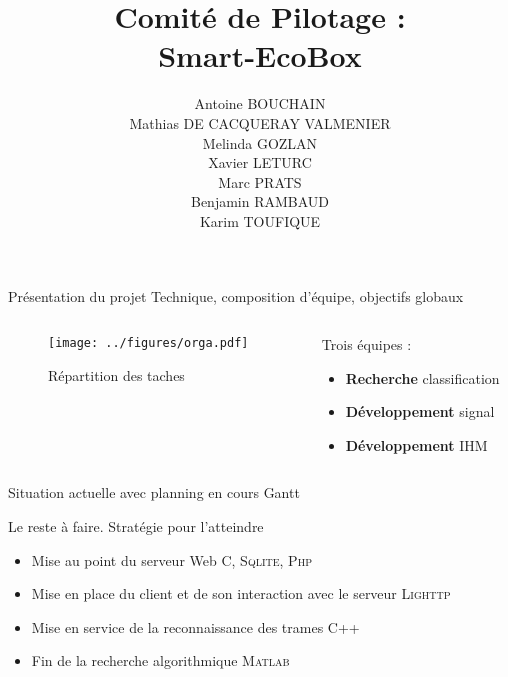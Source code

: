\documentclass{beamer}
\title[Comité de Pilotage : Smart-EcoBox]{Comité de Pilotage :\\
Smart-EcoBox}
\author{Antoine BOUCHAIN \\
Mathias DE CACQUERAY VALMENIER \\
Melinda GOZLAN \\
Xavier LETURC \\
Marc PRATS \\
Benjamin RAMBAUD \\
Karim TOUFIQUE \\}
\institute{\textsc{ENSEIRB-MATMECA}}
\begin{document}
\begin{frame}
\titlepage
\end{frame}


\begin{frame}{Présentation du projet Technique, composition d’équipe, objectifs globaux}
   \begin{columns}[c]
  \begin{column}{8cm}
 \begin{figure}[h!]
 \centering
 	\texttt{[image: ../figures/orga.pdf]} 
 	\caption{Répartition des taches}
 	\label{figd3}
 \end{figure}
  \end{column}
  \begin{column}{3.7cm}
  \vspace{-50pt}
 \begin{exampleblock}{Trois équipes :} %
  \begin{itemize}
  \item \textbf{Recherche} classification
  \item \textbf{Développement} signal
  \item \textbf{Développement} IHM
  \end{itemize}
  \end{exampleblock}
  \end{column}
  \end{columns}
 \end{frame}

\begin{frame}[c]{Situation actuelle avec planning en cours}
Gantt
\end{frame}

\begin{frame}{Le reste à faire. Stratégie pour l’atteindre}
  \begin{itemize}
    \item Mise au point du serveur Web \textsc{C, Sqlite, Php}
    \item Mise en place du client et de son interaction avec le serveur \textsc{Lighttp}
    \item Mise en service de la reconnaissance des trames \textsc{C++}
    \item Fin de la recherche algorithmique \textsc{Matlab}
  \end{itemize}
\end{frame}
\end{document}

